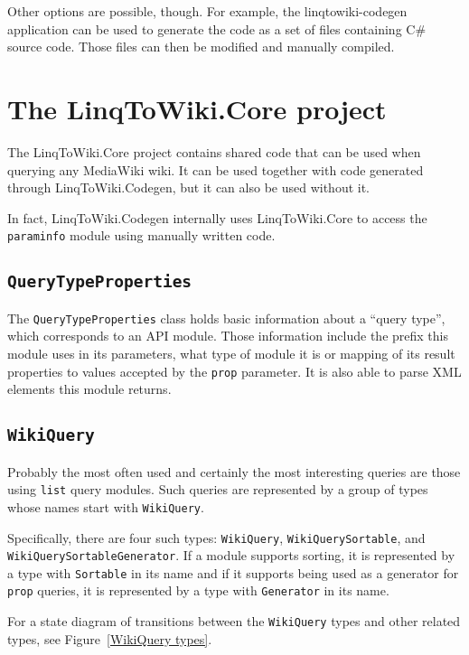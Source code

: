 Other options are possible, though.
For example, the linqtowiki-codegen application can be used to generate the code as a set of files containing C\# source code.
Those files can then be modified and manually compiled.

\section{The LinqToWiki.Core project}

The LinqToWiki.Core project contains shared code that can be used when querying any MediaWiki wiki.
It can be used together with code generated through LinqToWiki\allowbreak{}.Codegen,
but it can also be used without it.

In fact, LinqToWiki.\allowbreak{}Codegen internally uses LinqToWiki.Core to access the \texttt{paraminfo} module
using manually written code.

\subsection{\lstinline{QueryTypeProperties}}

The \lstinline{QueryTypeProperties} class holds basic information about a “query type”,
which corresponds to an API module.
Those information include the prefix this module uses in its parameters,
what type of module it is or mapping of its result properties to values accepted by the \texttt{prop} parameter.
It is also able to parse XML elements this module returns.

\subsection{\lstinline{WikiQuery}}

Probably the most often used and certainly the most interesting queries are those using \texttt{list} query modules.
Such queries are represented by a group of types whose names start with \lstinline{WikiQuery}.

Specifically, there are four such types:
\lstinline{WikiQuery}, \lstinline{WikiQuerySortable},  and \lstinline{WikiQuerySortableGenerator}.
If a module supports sorting, it is represented by a type with \lstinline{Sortable} in its name
and if it supports being used as a generator for \texttt{prop} queries, it is represented by a type with \lstinline{Generator} in its name.

For a state diagram of transitions between the \lstinline{WikiQuery} types and other related types, see Figure~\ref{WikiQuery types}.

